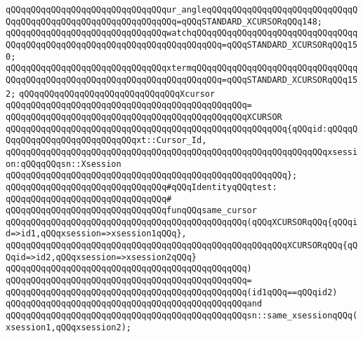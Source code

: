 \verb|qQQqqQQqqQQqqQQqqQQqqQQqqQQqqQQqur_angleqQQqqQQqqQQqqQQqqQQqqQQqqQQqqQQqqQQqqQQqqQQqqQQqqQQqqQQqqQQqqQQq=qQQqSTANDARD_XCURSORqQQq148;|\newline
\verb|qQQqqQQqqQQqqQQqqQQqqQQqqQQqqQQqwatchqQQqqQQqqQQqqQQqqQQqqQQqqQQqqQQqqQQqqQQqqQQqqQQqqQQqqQQqqQQqqQQqqQQqqQQqqQQq=qQQqSTANDARD_XCURSORqQQq150;|\newline
\verb|qQQqqQQqqQQqqQQqqQQqqQQqqQQqqQQqxtermqQQqqQQqqQQqqQQqqQQqqQQqqQQqqQQqqQQqqQQqqQQqqQQqqQQqqQQqqQQqqQQqqQQqqQQqqQQq=qQQqSTANDARD_XCURSORqQQq152;|\newline
\newline
\verb|qQQqqQQqqQQqqQQqqQQqqQQqqQQqqQQqXcursor|\newline
\verb|qQQqqQQqqQQqqQQqqQQqqQQqqQQqqQQqqQQqqQQqqQQqqQQq=|\newline
\verb|qQQqqQQqqQQqqQQqqQQqqQQqqQQqqQQqqQQqqQQqqQQqqQQqXCURSOR|\newline
\verb|qQQqqQQqqQQqqQQqqQQqqQQqqQQqqQQqqQQqqQQqqQQqqQQqqQQqqQQq{qQQqid:qQQqqQQqqQQqqQQqqQQqqQQqqQQqqQQqxt::Cursor_Id,|\newline
\verb|qQQqqQQqqQQqqQQqqQQqqQQqqQQqqQQqqQQqqQQqqQQqqQQqqQQqqQQqqQQqqQQqxsession:qQQqqQQqsn::Xsession|\newline
\verb|qQQqqQQqqQQqqQQqqQQqqQQqqQQqqQQqqQQqqQQqqQQqqQQqqQQqqQQq};|\newline
\newline
\verb|qQQqqQQqqQQqqQQqqQQqqQQqqQQqqQQq#qQQqIdentityqQQqtest:|\newline
\verb|qQQqqQQqqQQqqQQqqQQqqQQqqQQqqQQq#|\newline
\verb|qQQqqQQqqQQqqQQqqQQqqQQqqQQqqQQqfunqQQqsame_cursor|\newline
\verb|qQQqqQQqqQQqqQQqqQQqqQQqqQQqqQQqqQQqqQQqqQQqqQQq(qQQqXCURSORqQQq{qQQqid=>id1,qQQqxsession=>xsession1qQQq},|\newline
\verb|qQQqqQQqqQQqqQQqqQQqqQQqqQQqqQQqqQQqqQQqqQQqqQQqqQQqqQQqXCURSORqQQq{qQQqid=>id2,qQQqxsession=>xsession2qQQq}|\newline
\verb|qQQqqQQqqQQqqQQqqQQqqQQqqQQqqQQqqQQqqQQqqQQqqQQq)|\newline
\verb|qQQqqQQqqQQqqQQqqQQqqQQqqQQqqQQqqQQqqQQqqQQqqQQq=|\newline
\verb|qQQqqQQqqQQqqQQqqQQqqQQqqQQqqQQqqQQqqQQqqQQqqQQq(id1qQQq==qQQqid2)|\newline
\verb|qQQqqQQqqQQqqQQqqQQqqQQqqQQqqQQqqQQqqQQqqQQqqQQqand|\newline
\verb|qQQqqQQqqQQqqQQqqQQqqQQqqQQqqQQqqQQqqQQqqQQqqQQqsn::same_xsessionqQQq(xsession1,qQQqxsession2);|\newline
